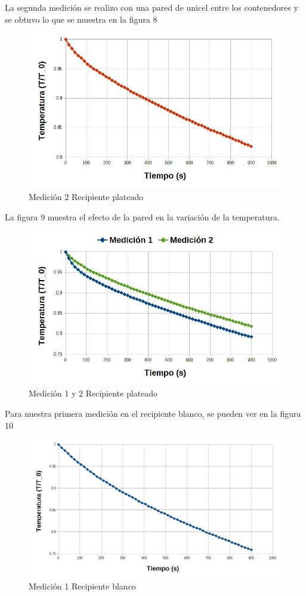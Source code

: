 \documentclass[12pt]{article}
\begin{document}
La segunda medición se realizo con una pared de unicel entre los contenedores y se obtuvo lo que se muestra en la figura 8
\begin{figure}[H]
\centering
\includegraphics[scale=0.4]{CM2.png}
\caption{Medición 2 Recipiente plateado}
\end{figure}

La figura 9 muestra el efecto de la pared en la variación de la temperatura.
\begin{figure}[H]
\centering
\includegraphics[scale=0.4]{CM1_2.png}
\caption{Medición 1 y 2 Recipiente plateado}
\end{figure}

Para nuestra primera medición en el recipiente blanco, se pueden ver en la figura 10

\begin{figure}[H]
\centering
\includegraphics[scale=0.4]{CB1.png}
\caption{Medición 1 Recipiente blanco}
\end{figure}
\end{document}
